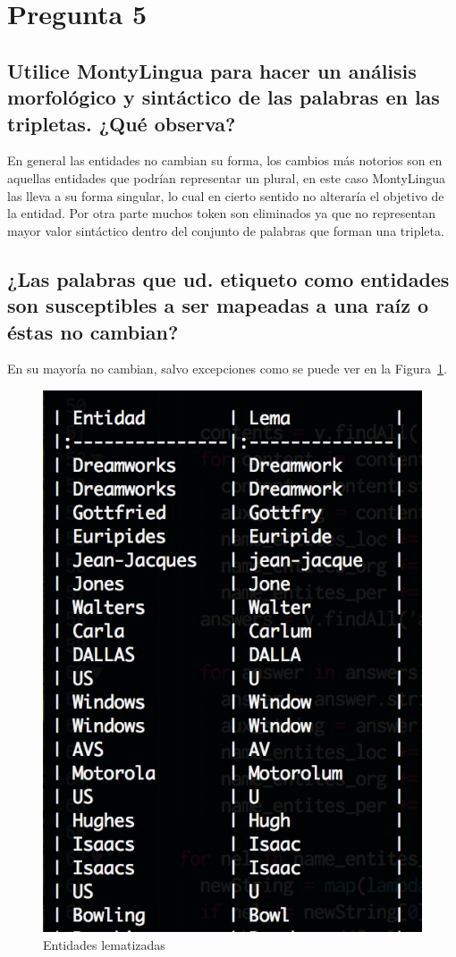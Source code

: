 \documentclass{article}
\begin{document}
\section{Pregunta 5}
\subsection{Utilice MontyLingua para hacer un análisis morfológico y sintáctico de las palabras en las tripletas. ¿Qué observa?} 
En general las entidades no cambian su forma, los cambios más notorios son en aquellas entidades que podrían representar un plural, en este caso MontyLingua las lleva a su forma singular, lo cual en cierto sentido no alteraría el objetivo de la entidad. Por otra parte muchos token son eliminados ya que no representan mayor valor sintáctico dentro del conjunto de palabras que forman una tripleta.

\subsection{¿Las palabras que ud. etiqueto como entidades son susceptibles a ser mapeadas a una raíz o éstas no cambian?}
En su mayoría no cambian, salvo excepciones como se puede ver en la Figura~\ref{fig:lemmas}.
\begin{figure}[h!]
\centering
\includegraphics[scale=0.5]{figuras/lemmas.png}
\caption{Entidades lematizadas}
\label{fig:lemmas}
\end{figure}
\end{document}
